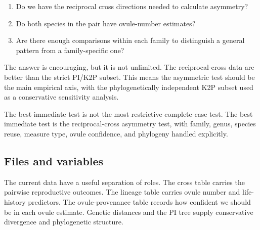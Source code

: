 \documentclass[12pt]{article}
\begin{document}
\begin{enumerate}
\item Do we have the reciprocal cross directions needed to calculate asymmetry?
\item Do both species in the pair have ovule-number estimates?
\item Are there enough comparisons within each family to distinguish a general pattern from a family-specific one?
\end{enumerate}

The answer is encouraging, but it is not unlimited. The reciprocal-cross data are better than the strict PI/K2P subset. This means the asymmetric test should be the main empirical axis, with the phylogenetically independent K2P subset used as a conservative sensitivity analysis.

\begin{conclusionbox}
The best immediate test is not the most restrictive complete-case test. The best immediate test is the reciprocal-cross asymmetry test, with family, genus, species reuse, measure type, ovule confidence, and phylogeny handled explicitly.
\end{conclusionbox}

\subsection{Files and variables}

The current data have a useful separation of roles. The cross table carries the pairwise reproductive outcomes. The lineage table carries ovule number and life-history predictors. The ovule-provenance table records how confident we should be in each ovule estimate. Genetic distances and the PI tree supply conservative divergence and phylogenetic structure.
\end{document}
